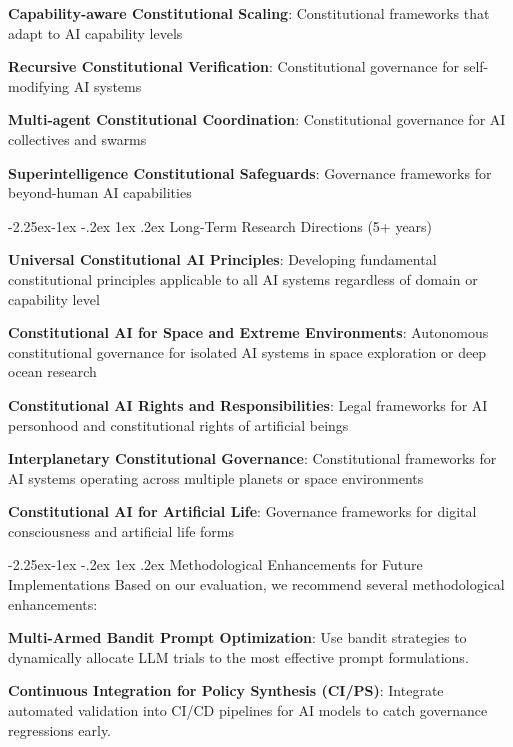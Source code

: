 \documentclass[manuscript,screen,9pt]{acmart}
\makeatletter
\renewcommand\subsection{\@startsection{subsection}{2}{\z@}%
  {-2.25ex\@plus -1ex \@minus -.2ex}%
  {1ex \@plus .2ex}%
  {\normalfont\large\bfseries}}
\makeatother
\begin{document}
\noindent\textbf{Capability-aware Constitutional Scaling}: Constitutional frameworks that adapt to AI capability levels

\noindent\textbf{Recursive Constitutional Verification}: Constitutional governance for self-modifying AI systems

\noindent\textbf{Multi-agent Constitutional Coordination}: Constitutional governance for AI collectives and swarms

\noindent\textbf{Superintelligence Constitutional Safeguards}: Governance frameworks for beyond-human AI capabilities

\subsection{Long-Term Research Directions (5+ years)}
\label{subsec:long_term_research}

\noindent\textbf{Universal Constitutional AI Principles}: Developing fundamental constitutional principles applicable to all AI systems regardless of domain or capability level

\noindent\textbf{Constitutional AI for Space and Extreme Environments}: Autonomous constitutional governance for isolated AI systems in space exploration or deep ocean research

\noindent\textbf{Constitutional AI Rights and Responsibilities}: Legal frameworks for AI personhood and constitutional rights of artificial beings

\noindent\textbf{Interplanetary Constitutional Governance}: Constitutional frameworks for AI systems operating across multiple planets or space environments

\noindent\textbf{Constitutional AI for Artificial Life}: Governance frameworks for digital consciousness and artificial life forms

\subsection{Methodological Enhancements for Future Implementations}
\label{subsec:methodology_optimization}
Based on our evaluation, we recommend several methodological enhancements:

\noindent\textbf{Multi-Armed Bandit Prompt Optimization}: Use bandit strategies to dynamically allocate LLM trials to the most effective prompt formulations.

\noindent\textbf{Continuous Integration for Policy Synthesis (CI/PS)}: Integrate automated validation into CI/CD pipelines for AI models to catch governance regressions early.
\end{document}
